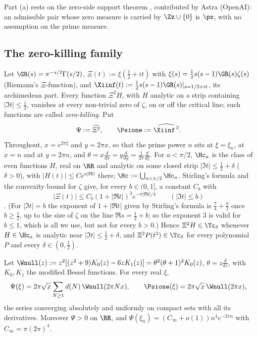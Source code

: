 Part (a) rests on the zero-side support theorem \cite[Theorem~3.6]{PaperI}, contributed by Astra (OpenAI): an admissible
pair whose zero measure is carried by $\Zz\cup\{0\}$ is $\pz$, with no assumption on the prime measure.

\subsection{The zero-killing family}\label{ssec:setting-family}

Let $\GR(s)=\pi^{-s/2}\Gamma(s/2)$, $\Xi(t):=\xi(\frac12+it)$ with $\xi(s)=\frac12s(s-1)\GR(s)\zeta(s)$ (Riemann's $\Xi$-function), and
$\Xiinf(t):=\frac12s(s-1)\GR(s)|_{s=1/2+it}$, its archimedean part. Every function $\Xi^2H$, with $H$ analytic on a strip
containing $\lvert\Im t\rvert\le\frac12$, vanishes at every non-trivial zero of $\zeta$, on or off the critical line; such functions
are called \emph{zero-killing}. Put
\[
\Psi:=\widehat{\Xi^2},\qquad \Psione:=\widehat{\Xiinf^{\,2}} .
\]
Throughout, $x=e^{2\pi\xi}$ and $y=2\pi x$, so that the prime power $n$ sits at $\xi=\xi_n$, at $x=n$ and at $y=2\pi n$, and
$\theta=x\frac{d}{dx}=y\frac{d}{dy}=\frac1{2\pi}\frac{d}{d\xi}$. For $a<\pi/2$, $\Hc_a$ is the class of even functions $H$, real on $\RR$
and analytic on some closed strip $\lvert\Im t\rvert\le\frac12+\delta$ ($\delta>0$), with $\lvert H(t)\rvert\le Ce^{a\lvert\Re t\rvert}$ there;
$\Hc:=\bigcup_{a<\pi/2}\Hc_a$. Stirling's formula and the convexity bound for $\zeta$ give, for every $b\in(0,1]$, a constant
$C_b$ with
\begin{equation}\label{eq:XB}
\lvert\Xi(t)\rvert\le C_b(1+\lvert\Re t\rvert)^{3}e^{-\pi\lvert\Re t\rvert/4}\qquad(\lvert\Im t\rvert\le b)
\end{equation}
\cite{Tit86}. (For $\lvert\Im t\rvert=b$ the exponent of $1+\lvert\Re t\rvert$ given by Stirling's formula is $\frac74+\frac b2$ once $b\ge\frac12$, up to
the size of $\zeta$ on the line $\Re s=\frac12+b$; so the exponent $3$ is valid for $b\le1$, which is all we use, but not for every
$b>0$.) Hence $\Xi^2H\in\Tc_\delta$ whenever $H\in\Hc_a$ is analytic near $\lvert\Im t\rvert\le\frac12+\delta$, and $\Xi^2P(t^2)\in\Tc_\delta$ for
every polynomial $P$ and every $\delta\in(0,\frac12)$.

\begin{fact}\label{thm:bessel}
Let $\Wnull(z):=z^2[(z^2+9)K_0(z)-6zK_1(z)]=\theta^2(\theta+1)^2K_0(z)$, $\theta=z\frac{d}{dz}$, with $K_0,K_1$ the modified Bessel
functions. For every real $\xi$,
\[
\Psi(\xi)=2\pi\sqrt x\sum_{N\ge1}d(N)\,\Wnull(2\pi Nx),\qquad \Psione(\xi)=2\pi\sqrt x\,\Wnull(2\pi x),
\]
the series converging absolutely and uniformly on compact sets with all its derivatives. Moreover $\Psi>0$ on $\RR$, and
$\Psi(\xi_n)=(C_\infty+o(1))n^4e^{-2\pi n}$ with $C_\infty=\pi(2\pi)^4$.
\end{fact}

